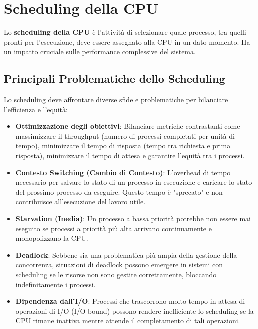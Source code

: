 \section{Scheduling della CPU}
Lo \textbf{scheduling della CPU} è l'attività di selezionare quale processo, tra quelli pronti per l'esecuzione, deve essere assegnato alla CPU in un dato momento. Ha un impatto cruciale sulle performance complessive del sistema.

\subsection{Principali Problematiche dello Scheduling}
Lo scheduling deve affrontare diverse sfide e problematiche per bilanciare l'efficienza e l'equità:
\begin{itemize}
    \item \textbf{Ottimizzazione degli obiettivi}: Bilanciare metriche contrastanti come massimizzare il throughput (numero di processi completati per unità di tempo), minimizzare il tempo di risposta (tempo tra richiesta e prima risposta), minimizzare il tempo di attesa e garantire l'equità tra i processi.
    \item \textbf{Contesto Switching (Cambio di Contesto)}: L'overhead di tempo necessario per salvare lo stato di un processo in esecuzione e caricare lo stato del prossimo processo da eseguire. Questo tempo è "sprecato" e non contribuisce all'esecuzione del lavoro utile.
    \item \textbf{Starvation (Inedia)}: Un processo a bassa priorità potrebbe non essere mai eseguito se processi a priorità più alta arrivano continuamente e monopolizzano la CPU.
    \item \textbf{Deadlock}: Sebbene sia una problematica più ampia della gestione della concorrenza, situazioni di deadlock possono emergere in sistemi con scheduling se le risorse non sono gestite correttamente, bloccando indefinitamente i processi.
    \item \textbf{Dipendenza dall'I/O}: Processi che trascorrono molto tempo in attesa di operazioni di I/O (I/O-bound) possono rendere inefficiente lo scheduling se la CPU rimane inattiva mentre attende il completamento di tali operazioni.
\end{itemize}

